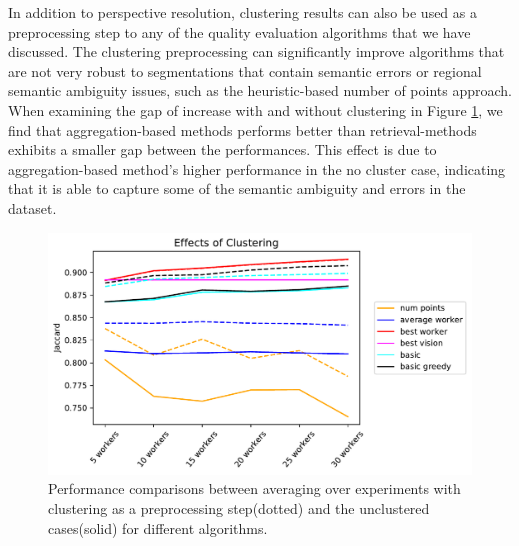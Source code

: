  \par In addition to perspective resolution, clustering results can also be used as a preprocessing step to any of the quality evaluation algorithms that we have discussed. The clustering preprocessing can significantly improve algorithms that are not very robust to segmentations that contain semantic errors or regional semantic ambiguity issues, such as the heuristic-based number of points approach. When examining the gap of increase with and without clustering in Figure \ref{cluster_effect}, we find that aggregation-based methods performs better than retrieval-methods exhibits a smaller gap between the performances. This effect is due to aggregation-based method's higher performance in the no cluster case, indicating that it is able to capture some of the semantic ambiguity and errors in the dataset.
    \begin{figure}[ht!]
      \centering
      \includegraphics[width=\textwidth]{plots/Effects_of_clustering.pdf}
      \caption{Performance comparisons between averaging over experiments with clustering as a preprocessing step(dotted) and the unclustered cases(solid) for different algorithms.}
      \label{cluster_effect}
    \end{figure}
